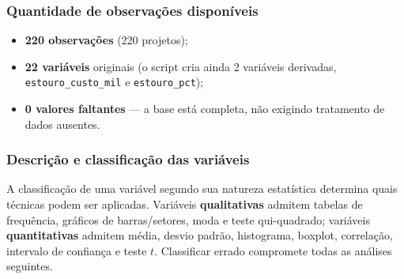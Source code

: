\documentclass[a4paper, 12pt]{article}
\newcommand{\var}[1]{\texttt{#1}}
\begin{document}
\subsubsection{Quantidade de observações disponíveis}
\begin{itemize}[noitemsep]
	\item \textbf{220 observações} (220 projetos);
	\item \textbf{22 variáveis} originais (o script cria ainda 2 variáveis
	      derivadas, \var{estouro\_custo\_mil} e \var{estouro\_pct});
	\item \textbf{0 valores faltantes} --- a base está completa, não exigindo
	      tratamento de dados ausentes.
\end{itemize}

\subsubsection{Descrição e classificação das variáveis}
A classificação de uma variável segundo sua natureza estatística determina quais
técnicas podem ser aplicadas. Variáveis \textbf{qualitativas} admitem tabelas de
frequência, gráficos de barras/setores, moda e teste qui-quadrado; variáveis
\textbf{quantitativas} admitem média, desvio padrão, histograma, boxplot,
correlação, intervalo de confiança e teste $t$. Classificar errado compromete
todas as análises seguintes.
\end{document}
